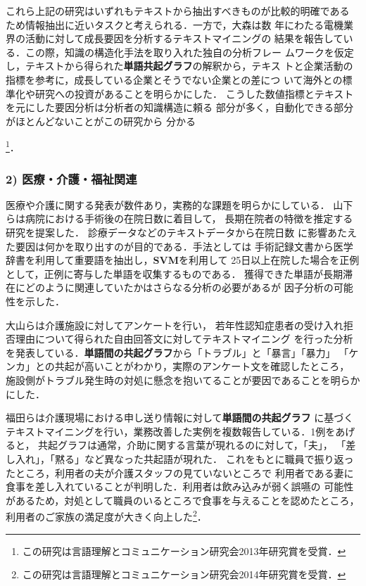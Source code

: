 \documentclass[twocolumn]{jarticle}
\begin{document}
これら上記の研究はいずれもテキストから抽出すべきものが比較的明確である
ため情報抽出に近いタスクと考えられる．一方で，大森\cite{ohmori2013}は数
年にわたる電機業界の活動に対して成長要因を分析するテキストマイニングの
結果を報告している．この際，知識の構造化手法を取り入れた独自の分析フレー
ムワークを仮定し，テキストから得られた{\bf 単語共起グラフ}の解釈から，テキス
トと企業活動の指標を参考に，成長している企業とそうでない企業との差につ
いて海外との標準化や研究への投資があることを明らかにした．
こうした数値指標とテキストを元にした要因分析は分析者の知識構造に頼る
部分が多く，自動化できる部分がほとんどないことがこの研究から
分かる{\footnote{この研究は言語理解とコミュニケーション研究会2013年研究賞を受賞．}．

\subsubsection*{2) 医療・介護・福祉関連}
医療や介護に関する発表が数件あり，実務的な課題を明らかにしている．
山下ら\cite{yamashita2014}は病院における手術後の在院日数に着目して，
長期在院者の特徴を推定する研究を提案した．
診療データなどのテキストデータから在院日数
に影響あたえた要因は何かを取り出すのが目的である．手法としては
手術記録文書から医学辞書を利用して重要語を抽出し，{\bf SVM}を利用して
25日以上在院した場合を正例として，正例に寄与した単語を収集するものである．
獲得できた単語が長期滞在にどのように関連していたかはさらなる分析の必要があるが
因子分析の可能性を示した．

大山ら\cite{ohyama2014}は介護施設に対してアンケートを行い，
若年性認知症患者の受け入れ拒否理由について得られた自由回答文に対してテキストマイニング
を行った分析を発表している．{\bf 単語間の共起グラフ}から「トラブル」と「暴言」「暴力」 
「ケンカ」との共起が高いことがわかり，実際のアンケート文を確認したところ，
施設側がトラブル発生時の対処に懸念を抱いてることが要因であることを明らかにした．

福田ら\cite{fukuda2014}は介護現場における申し送り情報に対して{\bf 単語間の共起グラフ}
に基づくテキストマイニングを行い，業務改善した実例を複数報告している．1例をあげると，
共起グラフは通常，介助に関する言葉が現れるのに対して，「夫」，
「差し入れ」，「黙る」など異なった共起語が現れた．
これをもとに職員で振り返ったところ，利用者の夫が介護スタッフの見ていないところで
利用者である妻に食事を差し入れていることが判明した．利用者は飲み込みが弱く誤嚥の
可能性があるため，対処として職員のいるところで食事を与えることを認めたところ，
利用者のご家族の満足度が大きく向上した\footnote{この研究は言語理解とコミュニケーション研究会2014年研究賞を受賞．}．

}
\end{document}
